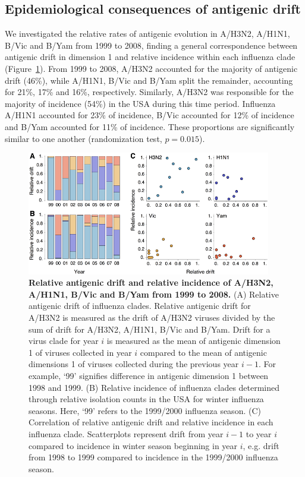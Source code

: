 \documentclass[11pt,oneside,letterpaper]{article}
\begin{document}
\subsection*{Epidemiological consequences of antigenic drift}

We investigated the relative rates of antigenic evolution in A/H3N2, A/H1N1, B/Vic and B/Yam from 1999 to 2008, finding a general correspondence between antigenic drift in dimension 1 and relative incidence within each influenza clade (Figure~\ref{incidence}).
From 1999 to 2008, A/H3N2 accounted for the majority of antigenic drift (46\%), while A/H1N1, B/Vic and B/Yam split the remainder, accounting for 21\%, 17\% and 16\%, respectively.
Similarly, A/H3N2 was responsible for the majority of incidence (54\%) in the USA during this time period.
Influenza A/H1N1 accounted for 23\% of incidence, B/Vic accounted for 12\% of incidence and B/Yam accounted for 11\% of incidence.
These proportions are significantly similar to one another (randomization test, $p = 0.015$).

\begin{figure}[tb]
	\centering		
	\includegraphics[width=0.95\textwidth]{figures/incidence}
	\caption{\textbf{Relative antigenic drift and relative incidence of A/H3N2, A/H1N1, B/Vic and B/Yam from 1999 to 2008.} 
	(A) Relative antigenic drift of influenza clades.
	Relative antigenic drift for A/H3N2 is measured as the drift of A/H3N2 viruses divided by the sum of drift for A/H3N2, A/H1N1, B/Vic and B/Yam.
	Drift for a virus clade for year $i$ is measured as the mean of antigenic dimension 1 of viruses collected in year $i$ compared to the mean of antigenic dimensions 1 of viruses collected during the previous year $i-1$.
	For example, `99' signifies difference in antigenic dimension 1 between 1998 and 1999.
	(B) Relative incidence of influenza clades determined through relative isolation counts in the USA for winter influenza seasons.
	Here, `99' refers to the 1999/2000 influenza season.
	(C) Correlation of relative antigenic drift and relative incidence in each influenza clade.
	Scatterplots represent drift from year $i-1$ to year $i$ compared to incidence in winter season beginning in year $i$, e.g. drift from 1998 to 1999 compared to incidence in the 1999/2000 influenza season.
	} 
	\label{incidence} 
\end{figure}
\end{document}
